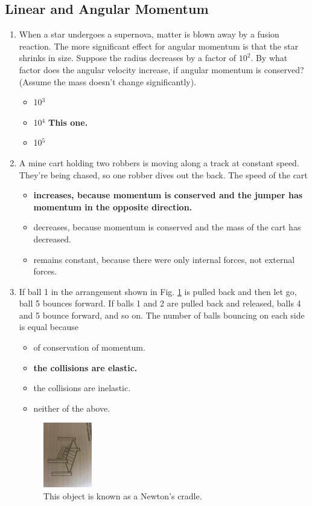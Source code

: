 \documentclass[10pt]{article}
\begin{document}
\subsection{Linear and Angular Momentum}
\begin{enumerate}
\item When a star undergoes a supernova, matter is blown away by a fusion reaction.  The more significant effect for angular momentum is that the star shrinks in size.  Suppose the radius decreases by a factor of $10^2$.  By what factor does the angular velocity increase, if angular momentum is conserved? (Assume the mass doesn't change significantly).
\begin{itemize}
\item 10$^3$
\item 10$^4$ \textbf{This one.}
\item 10$^5$
\end{itemize}
\item A mine cart holding two robbers is moving along a track at constant speed.  They're being chased, so one robber dives out the back.  The speed of the cart
\begin{itemize}
\item \textbf{increases, because momentum is conserved and the jumper has momentum in the opposite direction.}
\item decreases, because momentum is conserved and the mass of the cart has decreased.
\item remains constant, because there were only internal forces, not external forces.
\end{itemize}
\item If ball 1 in the arrangement shown in Fig. \ref{fig:newton} is pulled back and then let go, ball 5 bounces forward.  If balls 1 and 2 are pulled back and released, balls 4 and 5 bounce forward, and so on.  The number of balls bouncing on each side is equal because
\begin{itemize}
\item of conservation of momentum.
\item \textbf{the collisions are elastic.}
\item the collisions are inelastic.
\item neither of the above.
\end{itemize}
\begin{figure}
\centering
\includegraphics[width=0.2\textwidth,trim=20cm 5cm 15cm 20cm,clip=true]{newton.jpeg}
\caption{\label{fig:newton} This object is known as a Newton's cradle.}
\end{figure}
\end{enumerate}
\end{document}
